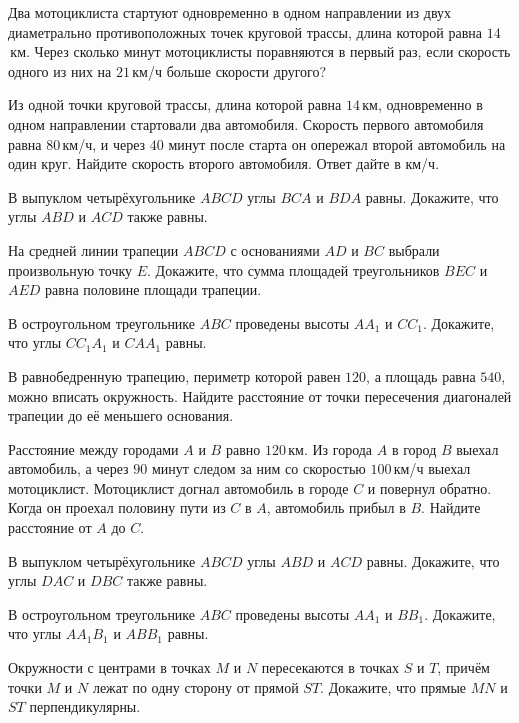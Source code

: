 \begin{class}[number=8]
	\begin{listofex}
		\item Два мотоциклиста стартуют одновременно в одном направлении из двух диаметрально противоположных точек круговой трассы, длина которой равна \(14\) км. Через сколько минут мотоциклисты поравняются в первый раз, если скорость одного из них на \(21\) км/ч больше скорости другого?
		\item Из одной точки круговой трассы, длина которой равна \(14\) км, одновременно в одном направлении стартовали два автомобиля. Скорость первого автомобиля равна \(80\) км/ч, и через \(40\) минут после старта он опережал второй автомобиль на один круг. Найдите скорость второго автомобиля. Ответ дайте в км/ч.
		\item В выпуклом четырёхугольнике \( ABCD \) углы \( BCA \)	и \( BDA \) равны. Докажите, что углы \( ABD \) и \( ACD \) также равны.
		\item На средней линии трапеции \( ABCD \) с основаниями \( AD \) и \( BC \) выбрали произвольную точку \( E \). Докажите, что сумма площадей треугольников \( BEC \) и \( AED \) равна половине площади трапеции.
		\item В остроугольном треугольнике \( ABC \) проведены высоты \( AA_1 \) и \( CC_1 \). Докажите, что углы \( CC_1A_1 \) и \( CAA_1 \) равны.
		\item В равнобедренную трапецию, периметр которой равен \( 120 \), а площадь равна \( 540 \), можно вписать окружность. Найдите расстояние от точки пересечения диагоналей трапеции до её меньшего основания.
	\end{listofex}
\end{class}

\begin{homework}[number=4]
	\begin{listofex}
		\item Расстояние между городами \( A \) и \( B \) равно \( 120 \) км. Из города \( A \) в город \( B \) выехал автомобиль, а через \( 90 \) минут следом за ним со скоростью \( 100 \) км/ч выехал мотоциклист. Мотоциклист догнал автомобиль в городе \( C \) и повернул обратно. Когда он проехал половину пути из \( C \) в \( A \), автомобиль прибыл в \( B \). Найдите расстояние от \( A \) до \( C \).
		\item В выпуклом четырёхугольнике \( ABCD \) углы \( ABD \) и \( ACD \) равны. Докажите, что углы \( DAC \) и \( DBC \) также равны.
		\item В остроугольном треугольнике \( ABC \) проведены высоты \( AA_1 \) и \( BB_1 \). Докажите, что углы \( AA_1B_1 \) и \( ABB_1 \) равны.
		\item Окружности с центрами в точках \( M \) и \( N \) пересекаются в точках \( S \) и \( T \), причём точки \( M \) и \( N \) лежат по одну сторону от прямой \( ST \). Докажите, что прямые \( MN \) и \( ST \) перпендикулярны.
	\end{listofex}
\end{homework}

